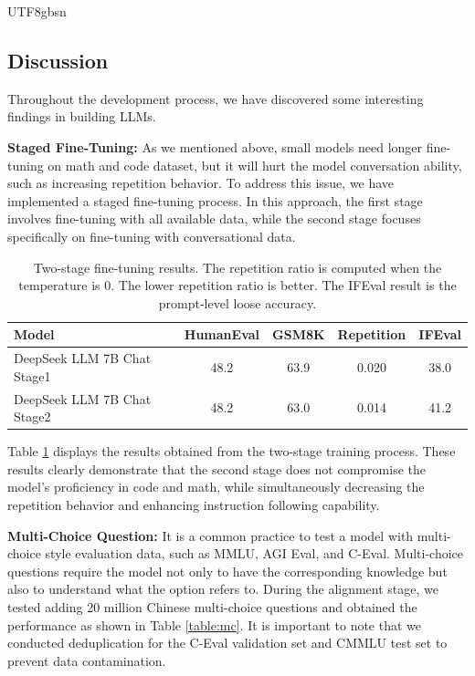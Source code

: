 \documentclass[11pt, a4paper, logo, copyright, nonumbering]{deepseek}
\begin{document}
\begin{CJK*}{UTF8}{gbsn}
\subsection{Discussion}

Throughout the development process, we have discovered some interesting findings in building LLMs. 

\textbf{Staged Fine-Tuning:} As we mentioned above, small models need longer fine-tuning on math and code dataset, but it will hurt the model conversation ability, such as increasing repetition behavior. To address this issue, we have implemented a staged fine-tuning process. In this approach, the first stage involves fine-tuning with all available data, while the second stage focuses specifically on fine-tuning with conversational data.

\begin{table}[h]
\centering  \small
\begin{tabular}{lcccc}
	\toprule
Model & HumanEval & GSM8K & Repetition & IFEval  \\ \midrule
DeepSeek LLM 7B Chat Stage1 & 48.2 & 63.9 & 0.020 & 38.0 \\ 
DeepSeek LLM 7B Chat Stage2 & 48.2 & 63.0 & 0.014 & 41.2\\ 	\bottomrule
\end{tabular}
\caption{Two-stage fine-tuning results. The repetition ratio is computed when the temperature is 0. The lower repetition ratio is better. The IFEval result is the prompt-level loose accuracy. }
\label{table:twostage}
\end{table}

Table \ref{table:twostage} displays the results obtained from the two-stage training process. These results clearly demonstrate that the second stage does not compromise the model's proficiency in code and math, while simultaneously decreasing the repetition behavior and enhancing instruction following capability.


\textbf{Multi-Choice Question:} It is a common practice to test a model with multi-choice style evaluation data, such as MMLU, AGI Eval, and C-Eval. Multi-choice questions require the model not only to have the corresponding knowledge but also to understand what the option refers to.  During the alignment stage, we tested adding 20 million  Chinese multi-choice questions and obtained the performance as shown in Table \ref{table:mc}. It is important to note that we conducted deduplication for the C-Eval validation set and CMMLU test set to prevent data contamination. 



\end{CJK*}
\end{document}

